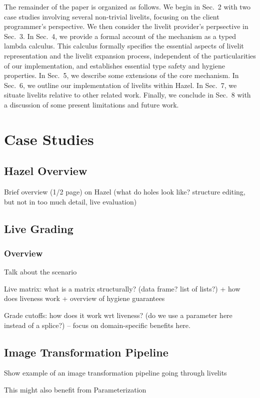 The remainder of the paper is organized as follows. We begin in Sec.~2 with two case studies 
involving several non-trivial livelits, focusing on the client programmer's perspective. 
We then consider the livelit provider's perpsective in Sec.~3.
In Sec.~4, we provide a formal account of the mechanism as a typed lambda calculus. 
This calculus formally specifies the essential aspects of livelit representation and 
the livelit expansion process, independent of the particularities of our implementation, 
and establishes essential type safety and hygiene properties. 
In Sec.~5, we describe some extensions of the core mechanism.
In Sec.~6, we outline our implementation of livelits within Hazel.
In Sec.~7, we situate livelits relative to other related work. 
Finally, we conclude in Sec.~8 with a discussion of some present limitations and future work.

\section{Case Studies}
\subsection{Hazel Overview}
Brief overview (1/2 page) on Hazel (what do holes look like? structure editing, but not in too much detail,
live evaluation)

\subsection{Live Grading}
\subsubsection{Overview}
Talk about the scenario

Live matrix: what is a matrix structurally? (data frame? list of lists?) + how does liveness work
+ overview of hygiene guarantees

Grade cutoffs: how does it work wrt liveness? (do we use a parameter here instead of a splice?) -- 
focus on domain-specific benefits here.

\subsection{Image Transformation Pipeline}
Show example of an image transformation pipeline going through livelits

This might also benefit from Parameterization

